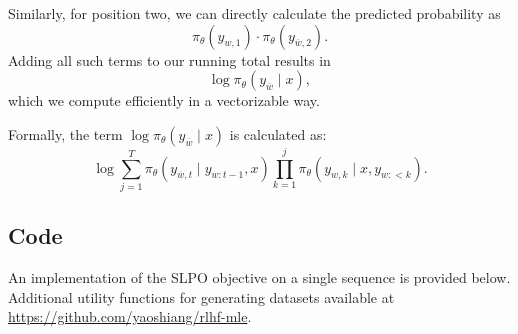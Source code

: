 \documentclass[twoside,11pt]{article}
\begin{document}
Similarly, for position 
two, we can directly calculate the predicted probability as 
\[
\pi_\theta(y_{w, 1}) \cdot \pi_\theta(y_{\overline{w}, 2}).
\]
Adding all such terms to our running total results in 
\[
\log \pi_\theta(y_{\overline{w}} \mid x),
\]
which we compute efficiently in a vectorizable way. 

Formally, the term \(\log \pi_\theta(y_{\overline{w}} \mid x)\) is calculated as:
\[
\log 
\sum_{j=1}^{T} 
  \pi_\theta(y_{\overline{w},t} \mid y_{w:t-1}, x)
\prod_{k=1}^{j} 
  \pi_\theta(y_{w,k} \mid x, y_{w:<k}).
\]


\subsection{Code}

An implementation of the SLPO objective on a single sequence 
is provided below. Additional utility functions for generating
datasets available at \url{https://github.com/yaoshiang/rlhf-mle}.
\end{document}
